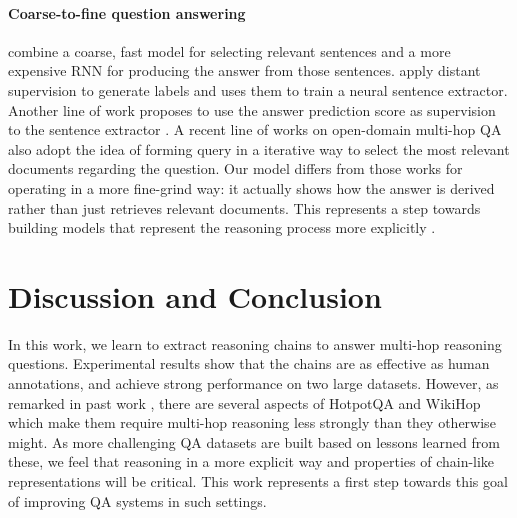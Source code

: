 \documentclass[11pt,a4paper]{article}
\begin{document}
\paragraph{Coarse-to-fine question answering}
 combine a coarse, fast model for selecting relevant sentences and a more expensive RNN for producing the answer from those sentences.  apply distant supervision to generate labels and uses them to train a neural sentence extractor. Another line of work proposes to use the answer prediction score as supervision to the sentence extractor \citep{wang2018r,indurthi2018cut,min2018efficient}. A recent line of works on open-domain multi-hop QA~\cite{feldman2019multi, das2019multi, asai2019learning, qi2019answering, godbole2019multi} also adopt the idea of forming query in a iterative way to select the most relevant documents regarding the question. Our model differs from those works for operating in a more fine-grind way: it actually shows how the answer is derived rather than just retrieves relevant documents. This represents a step towards building models that represent the reasoning process more explicitly \citep{trivedi2019repurposing, jiang2019explore}.

\section{Discussion and Conclusion}
In this work, we learn to extract reasoning chains to answer multi-hop reasoning questions. Experimental results show that the chains are as effective as human annotations, and achieve strong performance on two large datasets. However, as remarked in past work \citep{chen2019understanding,min2019compositional}, there are several aspects of HotpotQA and WikiHop which make them require multi-hop reasoning less strongly than they otherwise might. As more challenging QA datasets are built based on lessons learned from these, we feel that reasoning in a more explicit way and properties of chain-like representations will be critical. This work represents a first step towards this goal of improving QA systems in such settings.



\end{document}
